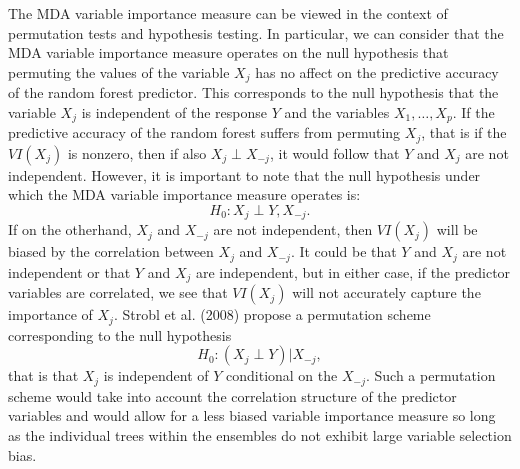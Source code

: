 \documentclass[12pt,twoside]{reedthesis}
\theoremstyle{definition}
\theoremstyle{definition}
\theoremstyle{definition}
\theoremstyle{remark}
\begin{document}
The MDA variable importance measure can be viewed in the context of
permutation tests and hypothesis testing. In particular, we can consider
that the MDA variable importance measure operates on the null hypothesis
that permuting the values of the variable \(X_j\) has no affect on the
predictive accuracy of the random forest predictor. This corresponds to
the null hypothesis that the variable \(X_j\) is independent of the
response \(Y\) and the variables \(X_1,\ldots,X_p\). If the predictive
accuracy of the random forest suffers from permuting \(X_j\), that is if
the \(VI(X_j)\) is nonzero, then if also \(X_j\perp X_{-j}\), it would
follow that \(Y\) and \(X_j\) are not independent. However, it is
important to note that the null hypothesis under which the MDA variable
importance measure operates is: \[H_0:X_j \perp Y,X_{-j}.\] If on the
otherhand, \(X_j\) and \(X_{-j}\) are not independent, then \(VI(X_j)\)
will be biased by the correlation between \(X_j\) and \(X_{-j}\). It
could be that \(Y\) and \(X_j\) are not independent or that \(Y\) and
\(X_j\) are independent, but in either case, if the predictor variables
are correlated, we see that \(VI(X_j)\) will not accurately capture the
importance of \(X_j\). Strobl et al. (2008) propose a permutation scheme
corresponding to the null hypothesis \[H_0:(X_j\perp Y)|X_{-j},\] that
is that \(X_j\) is independent of \(Y\) conditional on the \(X_{-j}\).
Such a permutation scheme would take into account the correlation
structure of the predictor variables and would allow for a less biased
variable importance measure so long as the individual trees within the
ensembles do not exhibit large variable selection bias. \par
\end{document}
